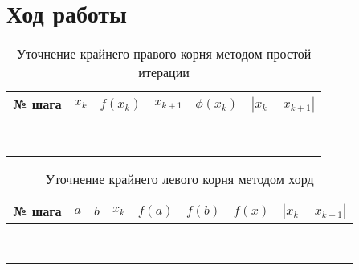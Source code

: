 \documentclass[12pt]{report}
\begin{document}
	\section*{Ход работы}
	\begin{table}[h!]
		\centering
		\begin{tabular}{|c|c|c|c|c|c|}
			\hline
			№ шага & $x_k$ & $f(x_k)$ & $x_{k+1}$ & $\phi(x_k)$ & $|x_k - x_{k+1}|$ \\ \hline
			 &  &  &  &  & \\ \hline
			 &  &  &  &  & \\ \hline
			 &  &  &  &  & \\ \hline
			 &  &  &  &  & \\ \hline
			 &  &  &  &  & \\ \hline
			 &  &  &  &  & \\ \hline
			 &  &  &  &  & \\ \hline
			 &  &  &  &  & \\ \hline
		\end{tabular}
		\caption{Уточнение крайнего правого корня методом простой итерации}
		\label{tab:1}
	\end{table}

	\begin{table}[h!]
		\centering
		\begin{tabular}{|c|c|c|c|c|c|c|c|}
			\hline
			№ шага & $a$ & $b$ & $x_k$ & $f(a)$ & $f(b)$ & $f(x)$ & $|x_k - x_{k+1}|$ \\ \hline
			&  &  &  &  &  &  & \\ \hline
			&  &  &  &  &  &  & \\ \hline
			&  &  &  &  &  &  & \\ \hline
			&  &  &  &  &  &  & \\ \hline
			&  &  &  &  &  &  & \\ \hline
			&  &  &  &  &  &  & \\ \hline
			&  &  &  &  &  &  & \\ \hline
			&  &  &  &  &  &  & \\ \hline
		\end{tabular}
		\caption{Уточнение крайнего левого корня методом хорд}
		\label{tab:2}
	\end{table}	
	
\end{document}
